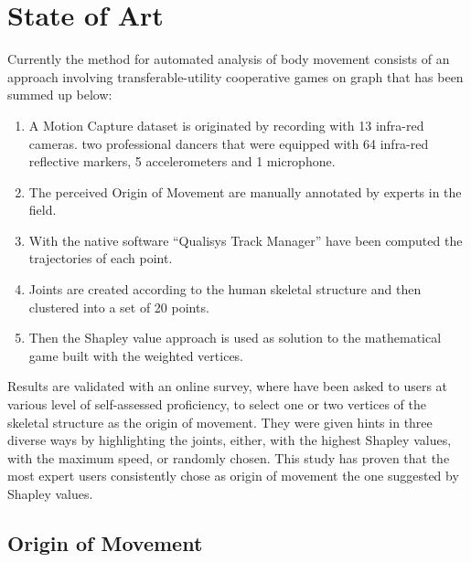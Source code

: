 \section{State of Art}
Currently the method for automated analysis of body movement consists of an approach involving transferable-utility cooperative games on graph \cite{kolykhalova:2020} that has been summed up below:  
\begin{enumerate}
    \item {A Motion Capture dataset is originated by recording with 13 infra-red cameras. two professional dancers that were equipped with 64 infra-red reflective markers, 5 accelerometers and 1 microphone.} 
    \item{The perceived Origin of Movement are manually annotated by experts in the field.} 
    \item{With the native software “Qualisys Track Manager” have been computed the trajectories of each point.}  
    \item{Joints are created according to the human skeletal structure and then clustered into a set of 20 points.} 
    \item{Then the Shapley value approach is used as solution to the mathematical game built with the weighted vertices.} 
\end{enumerate}
Results are validated with an online survey, where have been asked to users at various level of self-assessed proficiency, 
to select one or two vertices of the skeletal structure as the origin of movement.
They were given hints in three diverse ways by highlighting the joints, either, 
with the highest Shapley values, with the maximum speed, or randomly chosen. 
This study has proven that the most expert users consistently chose as 
origin of movement the one suggested by Shapley values. 

\subsection{Origin of Movement}